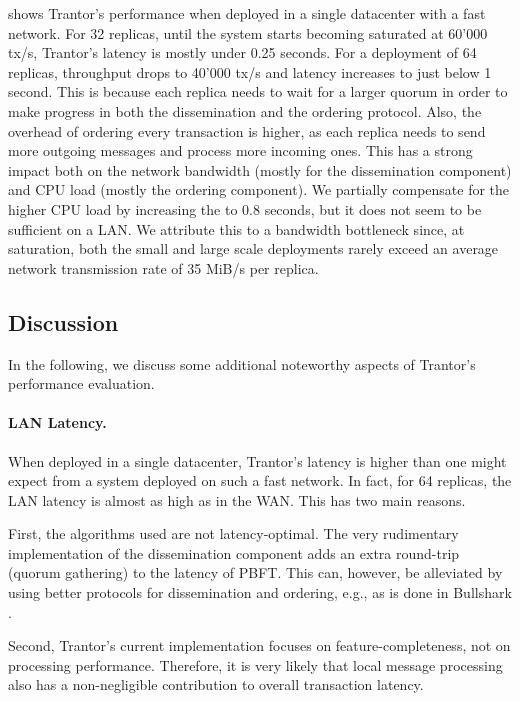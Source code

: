 \documentclass{article}
\begin{document}
 shows Trantor's performance when deployed in a single datacenter with a fast network.
For 32 replicas, until the system starts becoming saturated at 60'000 tx/s, Trantor's latency is mostly under 0.25 seconds.
For a deployment of 64 replicas, throughput drops to 40'000 tx/s and latency increases to just below 1 second.
This is because each replica needs to wait for a larger quorum in order to make progress in both the dissemination and the ordering protocol.
Also, the overhead of ordering every transaction is higher, as each replica needs to send more outgoing messages and process more incoming ones.
This has a strong impact both on the network bandwidth (mostly for the dissemination component) and CPU load (mostly the ordering component).
We partially compensate for the higher CPU load by increasing the  to 0.8 seconds,
but it does not seem to be sufficient on a LAN.
We attribute this to a bandwidth bottleneck since, at saturation, both the small and large scale deployments
rarely exceed an average network transmission rate of 35 MiB/s per replica.

\subsection{Discussion}

In the following, we discuss some additional noteworthy aspects of Trantor's performance evaluation.

\paragraph{LAN Latency.}
When deployed in a single datacenter, Trantor's latency is higher than one might expect from a system deployed on such a fast network.
In fact, for 64 replicas, the LAN latency is almost as high as in the WAN.
This has two main reasons.

First, the algorithms used are not latency-optimal.
The very rudimentary implementation of the dissemination component adds an extra round-trip (quorum gathering) to the latency of PBFT.
This can, however, be alleviated by using better protocols for dissemination and ordering, e.g., as is done in Bullshark \cite{bullshark}.

Second, Trantor's current implementation focuses on feature-completeness, not on processing performance.
Therefore, it is very likely that local message processing also has a non-negligible contribution to overall transaction latency.
\end{document}
